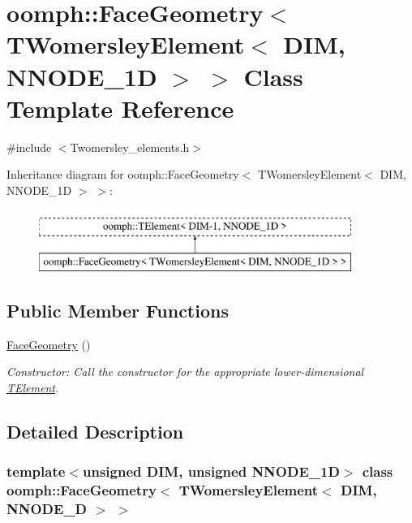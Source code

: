 \hypertarget{classoomph_1_1FaceGeometry_3_01TWomersleyElement_3_01DIM_00_01NNODE__1D_01_4_01_4}{}\section{oomph\+:\+:Face\+Geometry$<$ T\+Womersley\+Element$<$ D\+IM, N\+N\+O\+D\+E\+\_\+1D $>$ $>$ Class Template Reference}
\label{classoomph_1_1FaceGeometry_3_01TWomersleyElement_3_01DIM_00_01NNODE__1D_01_4_01_4}


{\ttfamily \#include $<$Twomersley\+\_\+elements.\+h$>$}

Inheritance diagram for oomph\+:\+:Face\+Geometry$<$ T\+Womersley\+Element$<$ D\+IM, N\+N\+O\+D\+E\+\_\+1D $>$ $>$\+:\begin{figure}[H]
\begin{center}
\leavevmode
\includegraphics[height=2.000000cm]{classoomph_1_1FaceGeometry_3_01TWomersleyElement_3_01DIM_00_01NNODE__1D_01_4_01_4}
\end{center}
\end{figure}
\subsection*{Public Member Functions}
\begin{DoxyCompactItemize}
\item 
\hyperlink{classoomph_1_1FaceGeometry_3_01TWomersleyElement_3_01DIM_00_01NNODE__1D_01_4_01_4_ad6124924235d691ccb2db24394e9b973}{Face\+Geometry} ()
\begin{DoxyCompactList}\small\item\em Constructor\+: Call the constructor for the appropriate lower-\/dimensional \hyperlink{classoomph_1_1TElement}{T\+Element}. \end{DoxyCompactList}\end{DoxyCompactItemize}


\subsection{Detailed Description}
\subsubsection*{template$<$unsigned D\+IM, unsigned N\+N\+O\+D\+E\+\_\+1D$>$\newline
class oomph\+::\+Face\+Geometry$<$ T\+Womersley\+Element$<$ D\+I\+M, N\+N\+O\+D\+E\+\_\+D $>$ $>$}

